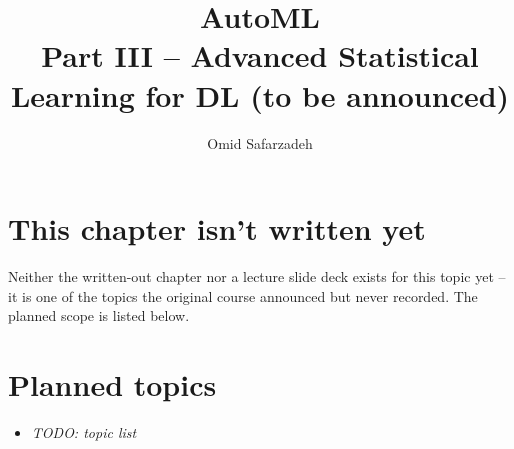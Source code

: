 \documentclass[11pt]{article}
\title{AutoML \\ \large Part III -- Advanced Statistical Learning for DL (to be announced)}
\author{Omid Safarzadeh}
\date{}
\begin{document}
\maketitle

\section*{This chapter isn't written yet}
Neither the written-out chapter nor a lecture slide deck exists for this
topic yet -- it is one of the topics the original course announced but
never recorded. The planned scope is listed below.




\section*{Planned topics}
\begin{itemize}
  \item \textit{TODO: topic list}
\end{itemize}
\end{document}
